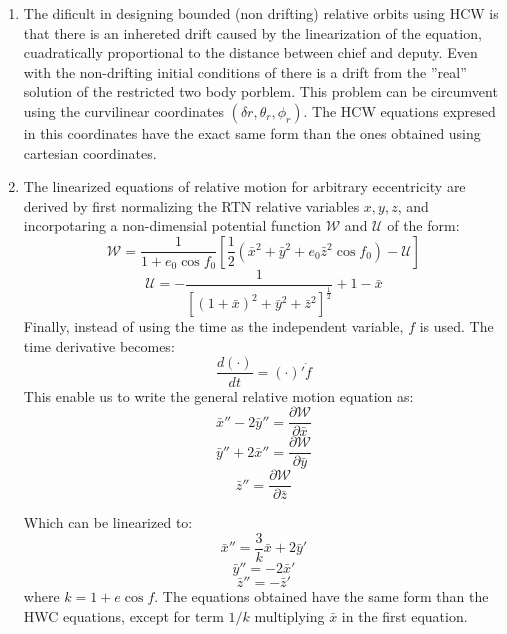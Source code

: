 \documentclass[a4paper]{article}
\begin{document}
\begin{enumerate}[label=\emph{\alph*)}]
  \item %
        The dificult in designing bounded (non drifting) relative orbits using HCW is that there is an inhereted drift caused by the linearization of the equation, cuadratically proportional to the distance between chief and deputy. Even with the non-drifting initial conditions of there is a drift from the ''real'' solution of the restricted two body porblem. This problem can be circumvent using the curvilinear coordinates $(\delta r,\theta_r,\phi_r)$. The HCW equations expresed in this coordinates have the exact same form than the ones obtained using cartesian coordinates.
  
  \item %
    The linearized equations of relative motion for arbitrary eccentricity are derived by first normalizing the RTN relative variables $x,y,z$, and incorpotaring a non-dimensial potential function $\mathscr{W}$ and $\mathscr{U}$ of the form:
   \[ \mathscr{W} = \frac{1}{1+e_0 \cos{f_0}} \left[ \frac{1}{2}(\bar{x}^2+\bar{y}^2+e_0 \bar{z}^2 \cos{f_0})-\mathscr{U} \right]  \]
   \[\mathscr{U} = -\frac{1}{\left[(1+\bar{x})^2+\bar{y}^2+\bar{z}^2 \right]^{\frac{1}{2}}}+1-\bar{x}\]
   Finally, instead of using the time as the independent variable, $f$ is used. The time derivative becomes:
   \[\frac{d(\cdot)}{dt}=(\cdot)'\dot{f}\]
   This enable us to write the general relative motion equation as:
   \[\bar{x}''-2\bar{y}''=\frac{\partial\mathscr{W}}{\partial\bar{x}}\]
   \[\bar{y}''+2\bar{x}''=\frac{\partial\mathscr{W}}{\partial\bar{y}}\]
   \[\bar{z}''=\frac{\partial\mathscr{W}}{\partial\bar{z}}\]

   Which can be linearized to:
   \[\bar{x}'' = \frac{3}{k} \bar{x}+2\bar{y}'\]
   \[\bar{y}''= -2\bar{x}' \]
   \[\bar{z}'' = -\bar{z}' \]
   where $k =  1+e\cos{f}$. The equations obtained have the same form than the HWC equations, except for term $1/k$ multiplying $\bar{x}$ in the first equation. 


\end{enumerate}
\end{document}
